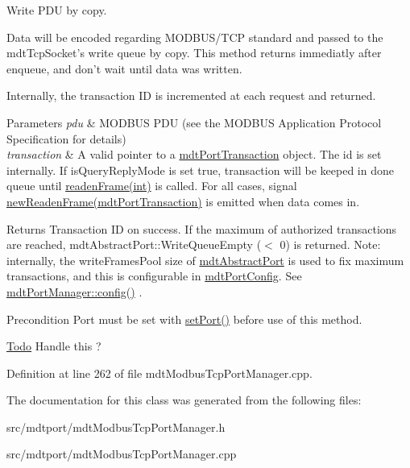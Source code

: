 Write PDU by copy. 

Data will be encoded regarding MODBUS/TCP standard and passed to the mdtTcpSocket's write queue by copy. This method returns immediatly after enqueue, and don't wait until data was written.

Internally, the transaction ID is incremented at each request and returned.


\begin{DoxyParams}{Parameters}
{\em pdu} & MODBUS PDU (see the MODBUS Application Protocol Specification for details) \\
\hline
{\em transaction} & A valid pointer to a \hyperlink{classmdt_port_transaction}{mdtPortTransaction} object. The id is set internally. If isQueryReplyMode is set true, transaction will be keeped in done queue until \hyperlink{classmdt_port_manager_a830ae182d06dd6a52c43a7f45b9240ac}{readenFrame(int)} is called. For all cases, signal \hyperlink{classmdt_port_manager_a915ff3372cccd5f412b828cc81a3381f}{newReadenFrame(mdtPortTransaction)} is emitted when data comes in. \\
\hline
\end{DoxyParams}
\begin{DoxyReturn}{Returns}
Transaction ID on success. If the maximum of authorized transactions are reached, mdtAbstractPort::WriteQueueEmpty ($<$ 0) is returned. Note: internally, the writeFramesPool size of \hyperlink{classmdt_abstract_port}{mdtAbstractPort} is used to fix maximum transactions, and this is configurable in \hyperlink{classmdt_port_config}{mdtPortConfig}. See \hyperlink{classmdt_port_manager_a9cf3ea2da38f81682695b37448712ffd}{mdtPortManager::config()} . 
\end{DoxyReturn}
\begin{DoxyPrecond}{Precondition}
Port must be set with \hyperlink{classmdt_port_manager_afcd156b2d0c9d340999935efb6cd8cb6}{setPort()} before use of this method. 
\end{DoxyPrecond}


\begin{Desc}
\item[\hyperlink{todo__todo000020}{Todo}]Handle this ? \end{Desc}




Definition at line 262 of file mdtModbusTcpPortManager.cpp.



The documentation for this class was generated from the following files:\begin{DoxyCompactItemize}
\item 
src/mdtport/mdtModbusTcpPortManager.h\item 
src/mdtport/mdtModbusTcpPortManager.cpp\end{DoxyCompactItemize}
